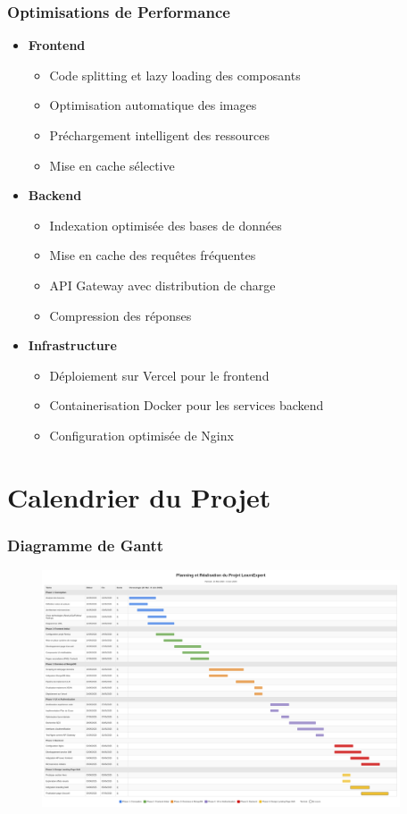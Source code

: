 \documentclass{beamer}
\begin{document}
\begin{frame}
\frametitle{Optimisations de Performance}
\begin{itemize}
    \item \textbf{Frontend}
    \begin{itemize}
        \item Code splitting et lazy loading des composants
        \item Optimisation automatique des images
        \item Préchargement intelligent des ressources
        \item Mise en cache sélective
    \end{itemize}
    \item \textbf{Backend}
    \begin{itemize}
        \item Indexation optimisée des bases de données
        \item Mise en cache des requêtes fréquentes
        \item API Gateway avec distribution de charge
        \item Compression des réponses
    \end{itemize}
    \item \textbf{Infrastructure}
    \begin{itemize}
        \item Déploiement sur Vercel pour le frontend
        \item Containerisation Docker pour les services backend
        \item Configuration optimisée de Nginx
    \end{itemize}
\end{itemize}
\end{frame}

\section{Calendrier du Projet}

\begin{frame}
\frametitle{Diagramme de Gantt}
\begin{center}
    \includegraphics[width=0.95\textwidth,height=7cm,keepaspectratio]{Screenshot 2025-06-08 at 20-35-06 Planning du Projet LearnExpert - Diagramme de Gantt.png}
\end{center}
\end{frame}
\end{document}
